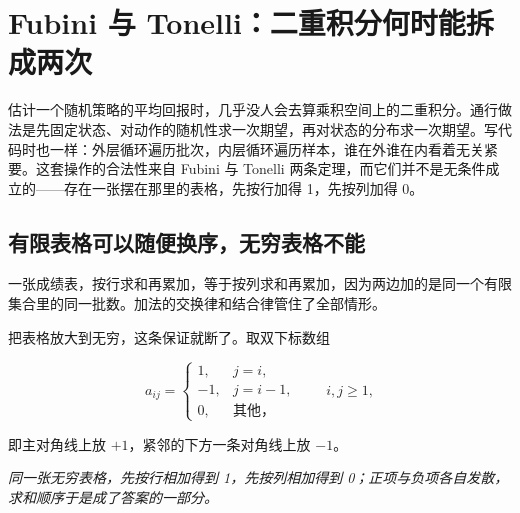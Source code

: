 \section{Fubini 与 Tonelli：二重积分何时能拆成两次}
\label{sec:12-Real-Analysis-Support/06-Product-Measures-and-Fubini/02}

估计一个随机策略的平均回报时，几乎没人会去算乘积空间上的二重积分。通行做法是先固定状态、对动作的随机性求一次期望，再对状态的分布求一次期望。写代码时也一样：外层循环遍历批次，内层循环遍历样本，谁在外谁在内看着无关紧要。这套操作的合法性来自 Fubini 与 Tonelli 两条定理，而它们并不是无条件成立的——存在一张摆在那里的表格，先按行加得 1，先按列加得 0。

\subsection{有限表格可以随便换序，无穷表格不能}

一张成绩表，按行求和再累加，等于按列求和再累加，因为两边加的是同一个有限集合里的同一批数。加法的交换律和结合律管住了全部情形。

把表格放大到无穷，这条保证就断了。取双下标数组

\[
a_{ij}=
\begin{cases}
1,&j=i,\\
-1,&j=i-1,\\
0,&\text{其他，}
\end{cases}
\qquad i,j\ge1,
\]

即主对角线上放 \(+1\)，紧邻的下方一条对角线上放 \(-1\)。

\begin{center}
\end{center}

\emph{同一张无穷表格，先按行相加得到 1，先按列相加得到 0；正项与负项各自发散，求和顺序于是成了答案的一部分。}

